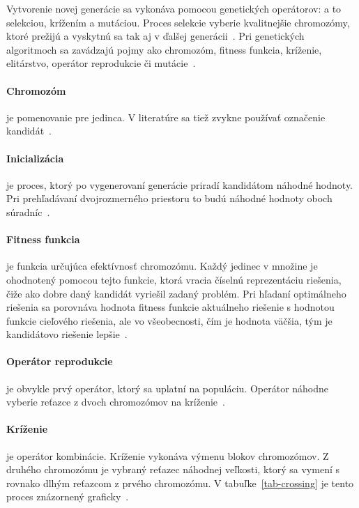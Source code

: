 \documentclass[a4paper,slovak,12pt,appendix]{article}
\begin{document}
Vytvorenie novej generácie sa vykonáva pomocou genetických operátorov:
a to selekciou, krížením a mutáciou. Proces selekcie vyberie kvalitnejšie
chromozómy, ktoré prežijú a vyskytnú sa tak aj v ďalšej
generácii~\cite{Simonova2007}. Pri genetických algoritmoch sa zavádzajú pojmy ako chromozóm, fitness funkcia,
kríženie, elitárstvo, operátor reprodukcie či mutácie~\cite{Chavan2015}.

\paragraph{Chromozóm} je pomenovanie pre jedinca. V literatúre sa tiež zvykne
používať označenie kandidát~\cite{Arun2016}.

\paragraph{Inicializácia} je proces, ktorý po vygenerovaní generácie priradí
kandidátom náhodné hodnoty. Pri prehľadávaní dvojrozmerného priestoru to budú
náhodné hodnoty oboch súradníc~\cite{Lazinica2009}.

\paragraph{Fitness funkcia} je funkcia určujúca efektívnosť chromozómu. Každý
jedinec v množine je ohodnotený pomocou tejto funkcie, ktorá vracia číselnú
reprezentáciu riešenia, čiže ako dobre daný kandidát vyriešil zadaný problém.
Pri hľadaní optimálneho riešenia sa porovnáva hodnota fitness funkcie aktuálneho
riešenie s hodnotou funkcie cieľového riešenia, ale vo všeobecnosti, čím je
hodnota väčšia, tým je kandidátovo riešenie
lepšie~\cite{Chavan2015, Lazinica2009, Simonova2007}.

\paragraph{Operátor reprodukcie} je obvykle prvý operátor, ktorý sa uplatní na
populáciu. Operátor náhodne vyberie reťazce z dvoch chromozómov na
kríženie~\cite{Chavan2015}.

\paragraph{Kríženie} je operátor kombinácie. Kríženie vykonáva výmenu blokov
chromozómov. Z druhého chromozómu je vybraný reťazec náhodnej veľkosti, ktorý
sa vymení s rovnako dlhým reťazcom z prvého chromozómu.
V tabuľke~\ref{tab-crossing} je tento proces znázornený
graficky~\cite{Chavan2015}.
\end{document}
